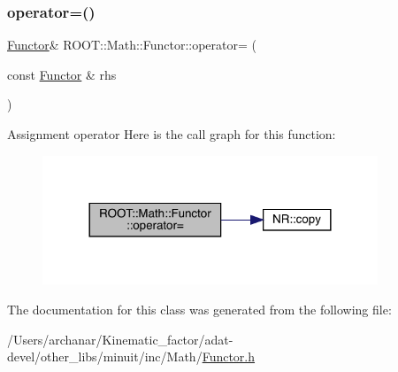 \subsubsection{\texorpdfstring{operator=()}{operator=()}\hspace{0.1cm}{\footnotesize\ttfamily [3/3]}}
{\footnotesize\ttfamily \mbox{\hyperlink{classROOT_1_1Math_1_1Functor}{Functor}}\& R\+O\+O\+T\+::\+Math\+::\+Functor\+::operator= (\begin{DoxyParamCaption}\item[{const \mbox{\hyperlink{classROOT_1_1Math_1_1Functor}{Functor}} \&}]{rhs }\end{DoxyParamCaption})\hspace{0.3cm}{\ttfamily [inline]}}

Assignment operator Here is the call graph for this function\+:
\nopagebreak
\begin{figure}[H]
\begin{center}
\leavevmode
\includegraphics[width=284pt]{da/d8e/classROOT_1_1Math_1_1Functor_a24bd9cdf7e31e443bff64c5fb4378c99_cgraph}
\end{center}
\end{figure}


The documentation for this class was generated from the following file\+:\begin{DoxyCompactItemize}
\item 
/\+Users/archanar/\+Kinematic\+\_\+factor/adat-\/devel/other\+\_\+libs/minuit/inc/\+Math/\mbox{\hyperlink{adat-devel_2other__libs_2minuit_2inc_2Math_2Functor_8h}{Functor.\+h}}\end{DoxyCompactItemize}
